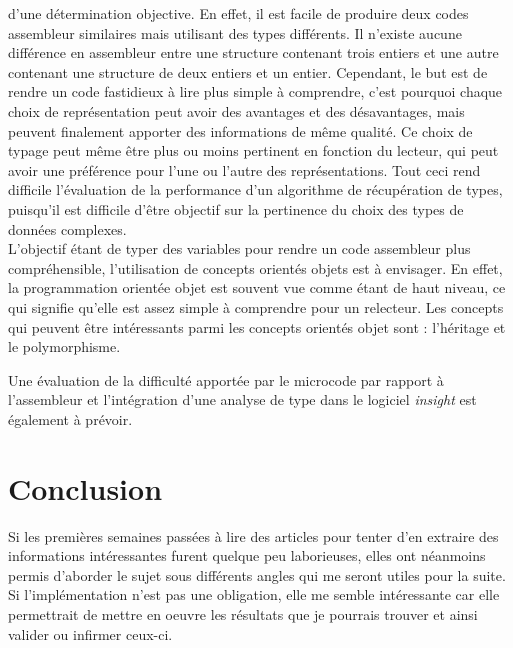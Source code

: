 \documentclass[a4paper,12pt]{article}
\begin{document}
d'une détermination objective. En effet, il est facile de produire deux
codes assembleur similaires mais utilisant des types différents. Il n'existe
aucune différence en assembleur entre une structure contenant trois entiers
et une autre contenant une structure de deux entiers et un entier. 
Cependant, le but est de rendre un code fastidieux à lire plus simple à
comprendre, c'est pourquoi chaque choix de représentation peut avoir des
avantages et des désavantages, mais peuvent finalement apporter des
informations de même qualité. Ce choix de typage peut même être plus ou
moins pertinent en fonction du lecteur, qui peut avoir une préférence pour
l'une ou l'autre des représentations. Tout ceci rend difficile l'évaluation
de la performance d'un algorithme de récupération de types, puisqu'il est
difficile d'être objectif sur la pertinence du choix des types de données
complexes. \\
L'objectif étant de typer des variables pour rendre un code assembleur plus
compréhensible, l'utilisation de concepts orientés objets est à envisager.
En effet, la programmation orientée objet est souvent vue comme étant de
haut niveau, ce qui signifie qu'elle est assez simple à comprendre pour un
relecteur. Les concepts qui peuvent être intéressants parmi les concepts
orientés objet sont : l'héritage et le polymorphisme.


Une évaluation de la
difficulté apportée par le microcode par rapport à l'assembleur et 
l'intégration d'une analyse de type dans le logiciel \textit{insight} est
également à prévoir.

\section{Conclusion}

Si les premières semaines passées à lire des articles pour tenter
d'en extraire des informations intéressantes furent quelque peu 
laborieuses, elles ont néanmoins permis d'aborder le sujet sous différents
angles qui me seront utiles pour la suite. Si l'implémentation n'est pas
une obligation, elle me semble intéressante car elle permettrait de mettre
en oeuvre les résultats que je pourrais trouver et ainsi valider ou infirmer
ceux-ci. 
\end{document}
